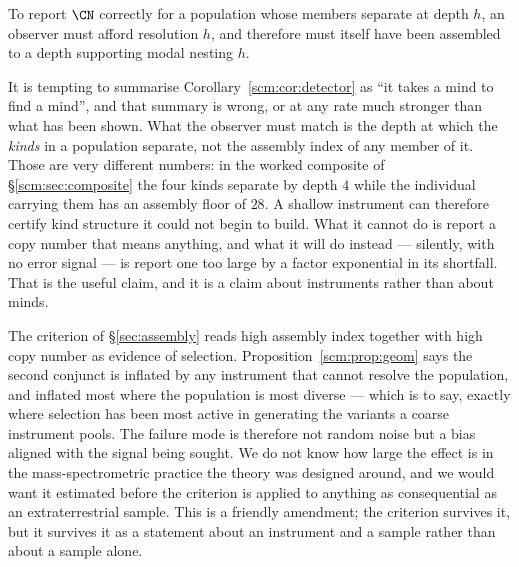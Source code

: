 \begin{corollary}
\label{scm:cor:detector}
To report $\CN$ correctly for a population whose members separate at depth
$h$, an observer must afford resolution $h$, and therefore must itself
have been assembled to a depth supporting modal nesting $h$.
\end{corollary}

\begin{remark}
\label{scm:rmk:notthatfar}
It is tempting to summarise Corollary~\ref{scm:cor:detector} as ``it takes
a mind to find a mind'', and that summary is wrong, or at any rate much
stronger than what has been shown. What the observer must match is the
depth at which the \emph{kinds} in a population separate, not the assembly
index of any member of it. Those are very different numbers: in the worked
composite of \S\ref{scm:sec:composite} the four kinds separate by depth
$4$ while the individual carrying them has an assembly floor of $28$. A
shallow instrument can therefore certify kind structure it could not begin
to build. What it cannot do is report a copy number that means anything,
and what it will do instead --- silently, with no error signal --- is
report one too large by a factor exponential in its shortfall. That is the
useful claim, and it is a claim about instruments rather than about minds.
\end{remark}

\begin{remark}
\label{scm:rmk:falsepos}
The criterion of \S\ref{sec:assembly} reads high assembly index together
with high copy number as evidence of selection.
Proposition~\ref{scm:prop:geom} says the second conjunct is inflated by
any instrument that cannot resolve the population, and inflated most where
the population is most diverse --- which is to say, exactly where selection
has been most active in generating the variants a coarse instrument pools.
The failure mode is therefore not random noise but a bias aligned with the
signal being sought. We do not know how large the effect is in the
mass-spectrometric practice the theory was designed around, and we would
want it estimated before the criterion is applied to anything as
consequential as an extraterrestrial sample. This is a friendly amendment;
the criterion survives it, but it survives it as a statement about an
instrument and a sample rather than about a sample alone.
\end{remark}

